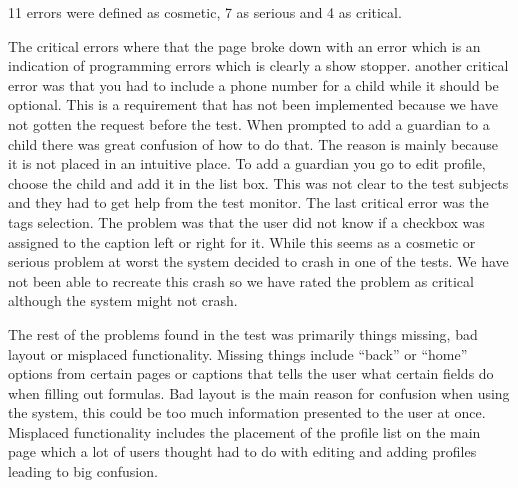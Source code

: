 11 errors were defined as cosmetic, 7 as serious and 4 as critical. 

The critical errors where that the page broke down with an error which is an indication of programming errors which is clearly a show stopper. another critical error was that you had to include a phone number for a child while it should be optional. This is a requirement that has not been implemented because we have not gotten the request before the test. When prompted to add a guardian to a child there was great confusion of how to do that. The reason is mainly because it is not placed in an intuitive place. To add a guardian you go to edit profile, choose the child and add it in the list box. This was not clear to the test subjects and they had to get help from the test monitor. The last critical error was the tags selection. The problem was that the user did not know if a checkbox was assigned to the caption left or right for it. While this seems as a cosmetic or serious problem at worst the system decided to crash in one of the tests. We have not been able to recreate this crash so we have rated the problem as critical although the system might not crash.

The rest of the problems found in the test was primarily things missing, bad layout or misplaced functionality. Missing things include ``back'' or ``home'' options from certain pages or captions that tells the user what certain fields do when filling out formulas. Bad layout is the main reason for confusion when using the system, this could be too much information presented to the user at once. Misplaced functionality includes the placement of the profile list on the main page which a lot of users thought had to do with editing and adding profiles leading to big confusion. 